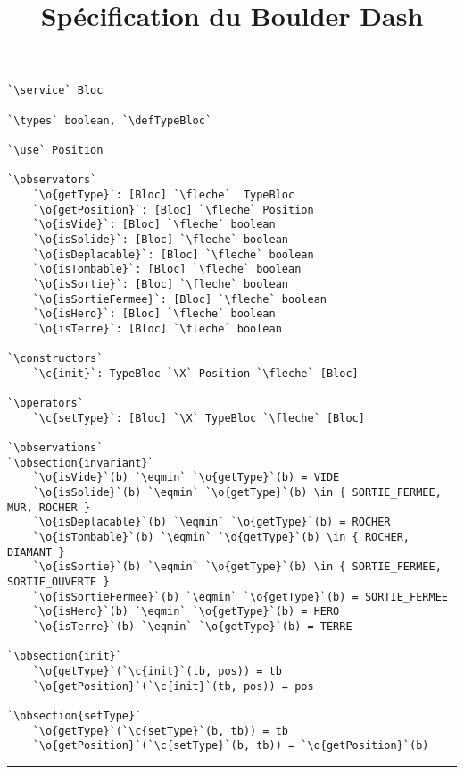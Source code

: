 \documentclass{article}
\title{Spécification du Boulder Dash}
\author{}
\date{}
\newcommand{\fleche}{$\rightarrow{}$}
\newcommand{\X}{$\times{}$}
\newcommand{\eqmin}{$\overset{min}{=}$}
\newcommand{\specsec}[1]{\normalfont{\Large{\textbf{#1:}}}}
\newcommand{\service}{\specsec {Service}}
\newcommand{\types}{\specsec {Types}}
\newcommand{\use}{\specsec {Use}}
\newcommand{\observators}{\specsec {Observators}}
\newcommand{\constructors}{\specsec {Constructors}}
\newcommand{\operators}{\specsec {Operators}}
\newcommand{\observations}{\specsec {Observations}}
\newcommand{\obsection}[1]{\textbf{[#1]}}
\newcommand{\TypeBloc}{TypeBloc}
\newcommand{\defTypeBloc}{\mbox{enum \TypeBloc}~\{~VIDE, TERRE, MUR, HERO, SORTIE\_FERMEE, SORTIE\_OUVERTE, ROCHER, DIAMANT~\}}
\renewcommand{\o}[1]{\textcolor{blue}{#1}}
\renewcommand{\c}[1]{\textcolor{red}{#1}}
\begin{document}
\begin{lstlisting}[caption=Bloc]
`\service` Bloc

`\types` boolean, `\defTypeBloc`

`\use` Position

`\observators`
	`\o{getType}`: [Bloc] `\fleche`  TypeBloc
	`\o{getPosition}`: [Bloc] `\fleche` Position
	`\o{isVide}`: [Bloc] `\fleche` boolean
	`\o{isSolide}`: [Bloc] `\fleche` boolean
	`\o{isDeplacable}`: [Bloc] `\fleche` boolean
	`\o{isTombable}`: [Bloc] `\fleche` boolean
	`\o{isSortie}`: [Bloc] `\fleche` boolean
	`\o{isSortieFermee}`: [Bloc] `\fleche` boolean
	`\o{isHero}`: [Bloc] `\fleche` boolean
	`\o{isTerre}`: [Bloc] `\fleche` boolean
	
`\constructors`
	`\c{init}`: TypeBloc `\X` Position `\fleche` [Bloc]
	
`\operators`
	`\c{setType}`: [Bloc] `\X` TypeBloc `\fleche` [Bloc]
	
`\observations`
`\obsection{invariant}`
	`\o{isVide}`(b) `\eqmin` `\o{getType}`(b) = VIDE
	`\o{isSolide}`(b) `\eqmin` `\o{getType}`(b) \in { SORTIE_FERMEE, MUR, ROCHER }
	`\o{isDeplacable}`(b) `\eqmin` `\o{getType}`(b) = ROCHER
	`\o{isTombable}`(b) `\eqmin` `\o{getType}`(b) \in { ROCHER, DIAMANT }
	`\o{isSortie}`(b) `\eqmin` `\o{getType}`(b) \in { SORTIE_FERMEE, SORTIE_OUVERTE }
	`\o{isSortieFermee}`(b) `\eqmin` `\o{getType}`(b) = SORTIE_FERMEE
	`\o{isHero}`(b) `\eqmin` `\o{getType}`(b) = HERO
	`\o{isTerre}`(b) `\eqmin` `\o{getType}`(b) = TERRE
	
`\obsection{init}`
	`\o{getType}`(`\c{init}`(tb, pos)) = tb
	`\o{getPosition}`(`\c{init}`(tb, pos)) = pos

`\obsection{setType}`
	`\o{getType}`(`\c{setType}`(b, tb)) = tb
	`\o{getPosition}`(`\c{setType}`(b, tb)) = `\o{getPosition}`(b)
\end{lstlisting}
	
\hrule
\clearpage{}
\end{document}
